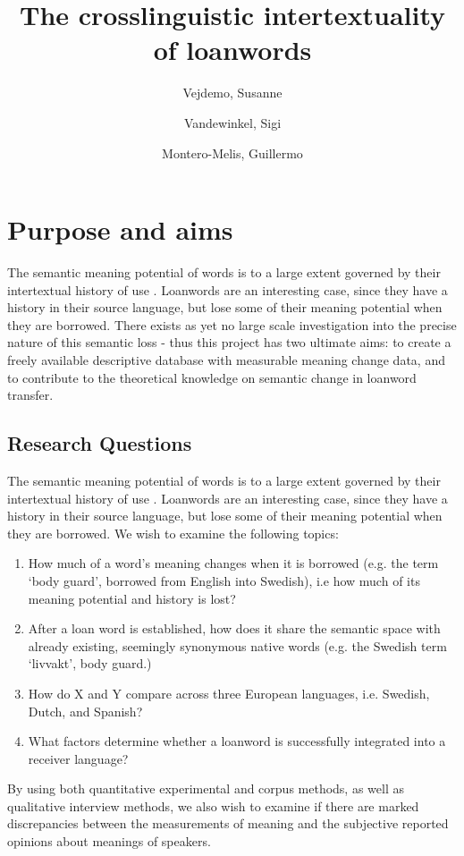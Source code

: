 \documentclass[a4paper]{article}
\title{The crosslinguistic intertextuality of loanwords}
\author{Vejdemo, Susanne \and Vandewinkel, Sigi \and Montero-Melis, Guillermo}
\begin{document}
\maketitle
\thispagestyle{fancy} %

\section{Purpose and aims}
The semantic meaning potential of words is to a large extent governed by their intertextual history of use \citep[see][]{Linell2005,Traugott2001}.
Loanwords are an interesting case, since they have a history in their source language, but lose some of their meaning potential when they are borrowed.
There exists as yet no large scale investigation into the precise nature of this semantic loss - thus this project has two ultimate aims: to create a freely available descriptive database with measurable meaning change data, and to contribute to the theoretical knowledge on semantic change in loanword transfer.

\subsection{Research Questions}
The semantic meaning potential of words is to a large extent governed by their intertextual history of use \citep[see][]{Linell2005,Traugott2001}.
Loanwords are an interesting case, since they have a history in their source language, but lose some of their meaning potential when they are borrowed.
We wish to examine the following topics:
%
\begin{enumerate}
	\item  How much of a word's meaning changes when it is borrowed (e.g. the term `body guard', borrowed from English into Swedish), i.e how much of its meaning potential and history is lost?
	\item  After a loan word is established, how does it share the semantic space with already existing, seemingly synonymous native words (e.g. the Swedish term `livvakt', body guard.)
	\item How do X and Y compare across three European languages, i.e. Swedish, Dutch, and Spanish?
	\item What factors determine whether a loanword is successfully integrated into a receiver language?
\end{enumerate}
%
By using both quantitative experimental and corpus methods, as well as qualitative interview methods, we also wish to examine if there are marked discrepancies between the measurements of meaning and the subjective reported opinions about meanings of speakers.
\end{document}
